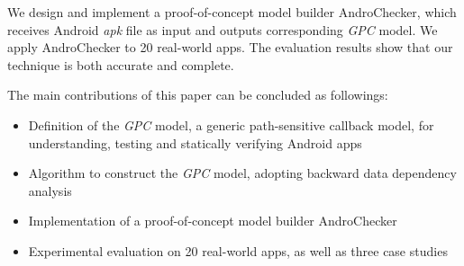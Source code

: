 We design and implement a proof-of-concept model builder AndroChecker, which receives Android \textit{apk} file as input and outputs corresponding \textit{GPC} model. We apply AndroChecker to 20 real-world apps. The evaluation results show that our technique is both accurate and complete. 

The main contributions of this paper can be concluded as followings: 
\begin{itemize}
\item Definition of the \textit{GPC} model, a generic path-sensitive callback model, for understanding, testing and statically verifying Android apps
\item Algorithm to construct the \textit{GPC} model, adopting backward data dependency analysis
\item Implementation of a proof-of-concept model builder AndroChecker
\item Experimental evaluation on 20 real-world apps, as well as three case studies
\end{itemize}

%
%
